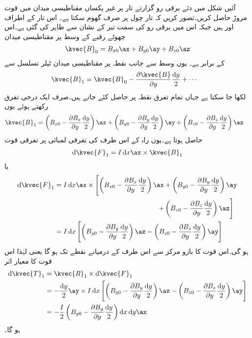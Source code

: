 آئیں شکل  میں دئے  برقی رو گزارتے تار پر غیر یکساں مقناطیسی میدان  میں قوت مروڑ حاصل کریں۔تصور کریں کہ تار چول  پر صرف گھوم سکتا ہے۔ اس تار کے اطراف  اور  ہیں جبکہ اس میں برقی رو  کی سمت تیر کے نشان سے ظاہر کی گئی ہے۔اس چھوٹے رقبے کے وسط  پر مقناطیسی میدان
\begin{align}
\kvec{B}_0=B_{x0}\ax+B_{y0}\ay+B_{z0}\az
\end{align}
کے برابر ہے۔ یوں وسط سے  جانب نقطہ  پر مقناطیسی میدان ٹیلر تسلسل سے
\begin{align*}
\kvec{B}_1&=\kvec{B}_0 -\frac{\partial \kvec{B}}{\partial y}\frac{\dif y}{2}+\cdots
\end{align*}
لکھا جا سکتا ہے جہاں تمام تفرق نقطہ  پر حاصل کئے جاتے ہیں۔صرف ایک درجی تفرق رکھتے ہوئے یوں
\begin{align*}
\kvec{B}_1&=\left(B_{x0}-\frac{\partial B_{x}}{\partial y} \frac{\dif y}{2}\right)\ax+\left(B_{y0}-\frac{\partial B_{y}}{\partial y} \frac{\dif y}{2}\right)\ay+\left(B_{z0}-\frac{\partial B_{z}}{\partial y} \frac{\dif y}{2}\right)\az
\end{align*}
حاصل ہوتا ہے۔یوں راہ کے اس طرف کی  تفرقی لمبائی پر تفرقی قوت
\begin{align*}
\dif \kvec{F}_1=I \dif x \ax \times \kvec{B}_1
\end{align*}
یا
\begin{align*}
\dif \kvec{F}_1&=I \dif x \ax \times \left[\left(B_{x0}-\frac{\partial B_{x}}{\partial y} \frac{\dif y}{2}\right)\ax+\left(B_{y0}-\frac{\partial B_{y}}{\partial y} \frac{\dif y}{2}\right)\ay \right. \\
& \quad \quad\quad \quad\quad \quad\quad \quad\quad \quad\quad \quad\quad\quad \quad \left. +\left(B_{z0}-\frac{\partial B_{z}}{\partial y} \frac{\dif y}{2}\right)\az \right]\\
&=I \dif x \left[\left(B_{y0}-\frac{\partial B_{y}}{\partial y} \frac{\dif y}{2}\right)\az-\left(B_{z0}-\frac{\partial B_{z}}{\partial y} \frac{\dif y}{2}\right)\ay \right]
\end{align*}
ہو گی۔اس قوت کا بازو مرکز سے اس طرف کے درمیانے نقطے تک ہو گا یعنی  لہٰذا اس قوت کا معیار اثر
\begin{align*}
\dif \kvec{T}_1&=\kvec{R}_1 \times \dif \kvec{F}_1\\
&=-\frac{\dif y}{2}\ay \times I \dif x \left[\left(B_{y0}-\frac{\partial B_{y}}{\partial y} \frac{\dif y}{2}\right)\az-\left(B_{z0}-\frac{\partial B_{z}}{\partial y} \frac{\dif y}{2}\right)\ay \right]\\
&=- \frac{I}{2}\left(B_{y0}-\frac{\partial B_{y}}{\partial y} \frac{\dif y}{2}\right)\dif x \dif y \ax
\end{align*}
ہو گا۔

